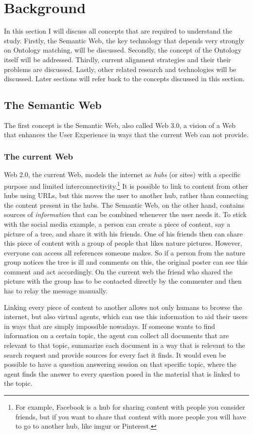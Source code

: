 \documentclass{article}
\begin{document}
 
\newpage
\section{Background}
 In this section I will discuss all concepts that are required to understand the study. Firstly, the Semantic Web, the key technology that depends very strongly on Ontology matching, will be discussed. Secondly, the concept of the Ontology itself will be addressed. Thirdly, current alignment strategies and their their problems are discussed. Lastly, other related research and technologies will be discussed. Later sections will refer back to the concepts discussed in this section.
 \subsection{The Semantic Web}
  The first concept is the Semantic Web, also called Web 3.0, a vision of a Web that enhances the User Experience in ways that the current Web can not provide. 
 \subsubsection{The current Web}
Web 2.0, the current Web, models the internet as \textit{hubs} (or sites) with a specific purpose and limited interconnectivity.\footnote{For example, Facebook is a hub for sharing content with people you consider friends, but if you want to share that content with more people you will have to go to another hub, like imgur or Pinterest.} It is possible to link to content from other hubs using URLs, but this moves the user to another hub, rather than connecting the content present in the hubs.
The Semantic Web, on the other hand, contains sources of \textit{information} that can be combined whenever the user needs it. To stick with the social media example, a person can create a piece of content, say a picture of a tree, and share it with his friends. One of his friends then can share this piece of content with a group of people that likes nature pictures. However, everyone can access all references someone makes. So if a person from the nature group notices the tree is ill and comments on this, the original poster can see this comment and act accordingly. On the current web the friend who shared the picture with the group has to be contacted directly by the commenter and then has to relay the message manually.

 Linking every piece of content to another allows not only humans to browse the internet, but also virtual agents, which can use this information to aid their users in ways that are simply impossible nowadays. If someone wants to find information on a certain topic, the agent can collect all documents that are relevant to that topic, summarize each document in a way that is relevant to the search request and provide sources for every fact it finds. It would even be possible to have a question answering session on that specific topic, where the agent finds the answer to every question posed in the material that is linked to the topic.
\end{document}
